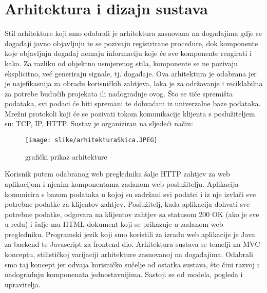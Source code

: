 \chapter{Arhitektura i dizajn sustava}
		


	Stil arhitekture koji smo odabrali je arhitektura zasnovana na događajima gdje se događaji javno objavljuju te se pozivaju registrirane procedure, dok komponente koje objavljuju događaj nemaju informaciju koje će sve komponente reagirati i kako. Za razliku od objektno usmjerenog stila, komponente se ne pozivaju eksplicitno, već generiraju signale, tj. događaje. Ova arhitektura je odabrana jer je najefikasnija za obradu korisničkih zahtjeva, laka je za održavanje i reciklabilna za potrebe budućih projekata ili nadogradnje ovog. Što se tiče spremišta podataka, svi podaci će biti spremani te dohvaćani iz univerzalne baze podataka. Mrežni protokoli koji će se pozivati tokom komunikacije klijenta s poslužiteljem su: TCP, IP, HTTP. 
Sustav je organiziran na sljedeći način: 
\begin{figure}[H]
			\texttt{[image: slike/arhitekturaSkica.JPEG]} %
			\caption{grafički prikaz arhitekture}
			\label{fig:arhitektura} %
			\end{figure}
Korisnik putem odabranog web preglednika šalje HTTP zahtjev za web aplikacijom i njenim komponentama zadanom web poslužitelju. Aplikacija komunicira s bazom podataka u kojoj su sadržani svi podatci i iz nje izvlači sve potrebne podatke za klijentov zahtjev. Poslužitelj, kada aplikacija dohvati sve potrebne podatke, odgovara na klijentov zahtjev sa statusom 200 OK (ako je sve u redu) i šalje mu HTML dokument koji se prikazuje u zadanom web pregledniku.
Programski jezik koji smo koristili za izradu web aplikacije je Java za backend te Javascript za frontend dio.
Arhitektura sustava se temelji na MVC konceptu, stilističkoj varijaciji arhitekture zasnovanoj na događajima. Odabrali smo taj koncept jer odvaja korisničko sučelje od ostatka sustava, što čini razvoj i nadogradnju komponenata jednostavnijima. Sastoji se od modela, pogleda i upravitelja.
		
